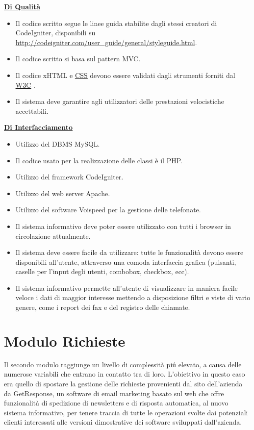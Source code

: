 \underline{\textbf{Di Qualit\`a}}
\begin{itemize}
\item Il codice scritto segue le linee guida stabilite dagli stessi creatori di CodeIgniter, disponibili su 
\url{http://codeigniter.com/user_guide/general/styleguide.html}.
\item Il codice scritto si basa sul pattern MVC.
\item Il codice xHTML e \hyperlink{css}{\underline{CSS}} devono essere validati dagli strumenti forniti dal \hyperlink{w3c}{\underline{W3C}} \cite{due}.
\item Il sistema deve garantire agli utilizzatori delle prestazioni velocistiche accettabili.
\end{itemize}

\underline{\textbf{Di Interfacciamento}}
\begin{itemize}
	  \item Utilizzo del DBMS MySQL.
	  \item Il codice usato per la realizzazione delle classi \`e il PHP.			
	  \item Utilizzo del framework CodeIgniter.
	  \item Utilizzo del web server Apache.
	  \item Utilizzo del software Voispeed per la gestione delle telefonate.
	  \item Il sistema informativo deve poter essere utilizzato con tutti i browser in circolazione attualmente.
	  \item Il sistema deve essere facile da utilizzare: tutte le funzionalit\`a devono essere disponibili all’utente, attraverso una comoda interfaccia grafica (pulsanti, caselle per l’input degli utenti, combobox, checkbox, ecc).
	  \item Il sistema informativo permette all’utente di visualizzare in maniera facile veloce i dati di maggior interesse mettendo a disposizione filtri e viste di vario genere, come i report dei fax e del registro delle chiamate.
\end{itemize}

\newpage
\section{Modulo Richieste}
Il secondo modulo raggiunge un livello di complessit\`a pi\'u elevato, a causa delle numerose variabili che entrano in contatto tra di loro. L'obiettivo in questo caso era quello di spostare la gestione delle richieste provenienti dal sito dell'azienda da GetResponse, un software di email marketing basato sul web che offre funzionalit\`a di spedizione di newsletters e di risposta automatica, al nuovo sistema informativo, per tenere traccia di tutte le operazioni svolte dai potenziali clienti interessati alle versioni dimostrative dei software sviluppati dall'azienda. 

